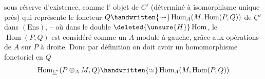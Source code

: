 sous réserve d'existence, comme l' objet de $\underline C'$ (déterminé à isomorphisme unique près) qui représente le foncteur %
$Q\handwritten{\leadsto}\operatorname{Hom}_A(M,\operatorname{Hom}(P,Q))$ de
$\underline C'$ dans $(\mathrm{Ens})$, -- où\handwritten{,} dans le double $\deleted{\unsure{H}}\operatorname{Hom}$, le $\operatorname{Hom}(P,Q)$ est considéré
comme un $A$-module à gauche, grâce aux opérations de $A$ sur $P$ à droite. Donc
par définition on doit avoir un homomorphisme fonctoriel en $Q$
\[
\operatorname{Hom}_{\underline C'}(P\otimes_A M,Q)\handwritten{\simeq}\operatorname{Hom}_A(M,\operatorname{Hom}(P,Q))
\]

